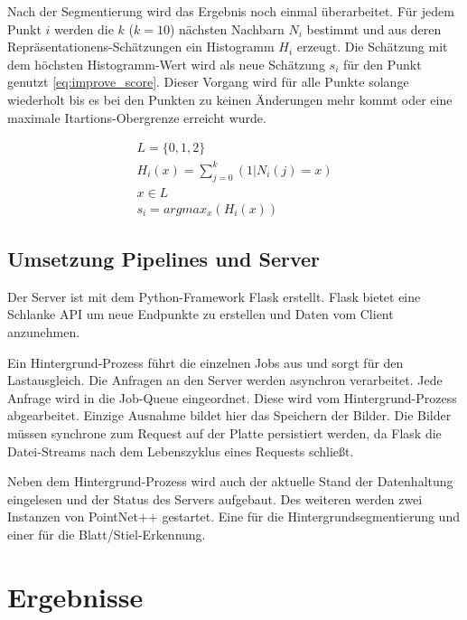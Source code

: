 \documentclass[12pt,titlepage, twoside]{article}
\begin{document}
Nach der Segmentierung wird das Ergebnis noch einmal überarbeitet. Für jedem Punkt $i$ werden die $k$ ($k=10$) nächsten Nachbarn $N_i$ bestimmt und aus deren Repräsentationens-Schätzungen ein Histogramm $H_i$ erzeugt. 
Die Schätzung mit dem höchsten Histogramm-Wert wird als neue Schätzung $s_i$ für den Punkt genutzt \ref{eq:improve_score}. Dieser Vorgang wird für alle Punkte solange wiederholt bis es bei den Punkten zu keinen Änderungen mehr kommt oder eine maximale Itartions-Obergrenze erreicht wurde.

\begin{equation}
\label{eq:improve_score}
\begin{array}{l}
L =  \{0,1,2\}\\
H_i(x) = \sum_{j=0}^{k}{(1 | N_i(j) = x)}\\
x \in L\\
s_i = argmax_x(H_i(x))
\end{array}
\end{equation}

\subsection{Umsetzung Pipelines und Server}
\label{sec:realisierung:implementierung4}

Der Server ist mit dem Python-Framework Flask erstellt. Flask bietet eine Schlanke API um neue Endpunkte zu erstellen und Daten vom Client anzunehmen. 

Ein Hintergrund-Prozess führt die einzelnen Jobs aus und sorgt für den Lastausgleich. Die Anfragen an den Server werden asynchron verarbeitet. Jede Anfrage wird in die Job-Queue eingeordnet. Diese wird vom Hintergrund-Prozess abgearbeitet.
Einzige Ausnahme bildet hier das Speichern der Bilder. Die Bilder müssen synchrone zum Request auf der Platte persistiert werden, da Flask die Datei-Streams nach dem Lebenszyklus eines Requests schließt.

Neben dem Hintergrund-Prozess wird auch der aktuelle Stand der Datenhaltung eingelesen und der Status des Servers aufgebaut. Des weiteren werden zwei Instanzen von PointNet++ gestartet. 
Eine für die Hintergrundsegmentierung und einer für die Blatt/Stiel-Erkennung.

\newpage
\section{Ergebnisse}
\label{sec:ergebnisse}
%
\end{document}
